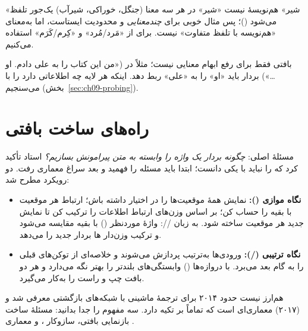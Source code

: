 \begin{correctionbox}{«شیر» هم‌نویسهٔ  نیست}
«شیر» در هر سه معنا (جنگل، خوراکی، شیرآب) یک‌جور تلفظ می‌شود ()؛ پس مثال خوبی برای \emph{چندمعنایی} و محدودیت  ایستاست، اما  به‌معنای «هم‌نویسه با تلفظ متفاوت» نیست. برای  از «مَرد/مُرد» و «کِرم/کَرَم» استفاده می‌کنیم.
\end{correctionbox}

 بافتی فقط برای رفع ابهام معنایی نیست؛ مثلاً در  («من این کتاب را به علی دادم. او …») بردار باید «او» را به «علی» ربط دهد. اینکه هر لایه چه اطلاعاتی دارد را با  می‌سنجیم (بخش~\ref{sec:ch09-probing}).

\section{راه‌های ساخت  بافتی}

مسئلهٔ اصلی: \emph{چگونه بردار یک واژه را وابسته به متن پیرامونش بسازیم؟} استاد تأکید کرد که  را نباید با  یکی دانست؛ ابتدا باید مسئله را فهمید و بعد سراغ معماری رفت. دو رویکرد مطرح شد:

\begin{itemize}
  \item \textbf{نگاه موازی ():} نمایش همهٔ موقعیت‌ها را در اختیار داشته باش؛ ارتباط هر موقعیت با بقیه را حساب کن؛ بر اساس وزن‌های ارتباط اطلاعات را ترکیب کن تا نمایش جدید هر موقعیت ساخته شود. به زبان //: واژهٔ موردنظر () با  بقیه مقایسه می‌شود و ترکیب وزن‌دار ها بردار جدید را می‌دهد.
  \item \textbf{نگاه ترتیبی (/):} ورودی‌ها به‌ترتیب پردازش می‌شوند و  خلاصه‌ای از توکن‌های قبلی را به گام بعد می‌برد.  با دروازه‌ها () وابستگی‌های بلندتر را بهتر نگه می‌دارد و  هر دو بافت چپ و راست را به‌کار می‌گیرد.
\end{itemize}

\begin{correctionbox}{ هم‌ارز  نیست}
 حدود ۲۰۱۴ برای ترجمهٔ ماشینی با شبکه‌های بازگشتی معرفی شد و  (۲۰۱۷) معماری‌ای است که تماماً بر  تکیه دارد. سه مفهوم را جدا بدانید: مسئلهٔ ساخت بازنمایی بافتی، سازوکار ، و معماری .
\end{correctionbox}

